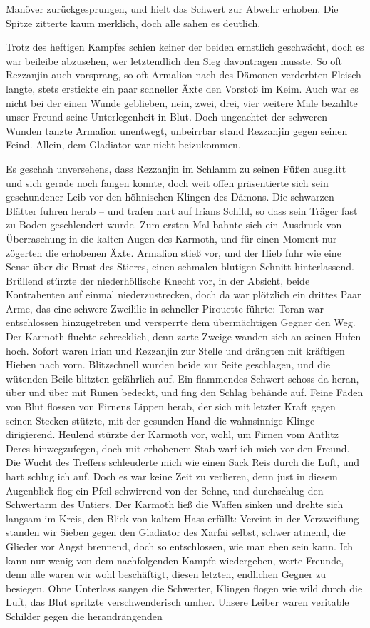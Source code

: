 Manöver zurückgesprungen, und hielt das Schwert zur Abwehr erhoben. Die Spitze zitterte kaum merklich, doch alle sahen es deutlich.

Trotz des heftigen Kampfes schien keiner der beiden ernstlich geschwächt, doch es war beileibe abzusehen, wer letztendlich den Sieg davontragen musste. So oft Rezzanjin auch vorsprang, so oft Armalion nach des Dämonen verderbten Fleisch langte, stets erstickte ein paar schneller Äxte den Vorstoß im Keim. Auch war es nicht bei der einen Wunde geblieben, nein, zwei, drei, vier weitere Male bezahlte unser Freund seine Unterlegenheit in Blut. Doch ungeachtet der schweren Wunden tanzte Armalion unentwegt, unbeirrbar stand Rezzanjin gegen seinen Feind. Allein, dem Gladiator war nicht beizukommen.

Es geschah unversehens, dass Rezzanjin im Schlamm zu seinen Füßen ausglitt und sich gerade noch fangen konnte, doch weit offen präsentierte sich sein geschundener Leib vor den höhnischen Klingen des Dämons. Die schwarzen Blätter fuhren herab -- und trafen hart auf Irians Schild, so dass sein Träger fast zu Boden geschleudert wurde. Zum ersten Mal bahnte sich ein Ausdruck von Überraschung in die kalten Augen des Karmoth, und für einen Moment nur zögerten die erhobenen Äxte. Armalion stieß vor, und der Hieb fuhr wie eine Sense über die Brust des Stieres, einen schmalen blutigen Schnitt hinterlassend. Brüllend stürzte der niederhöllische Knecht vor, in der Absicht, beide Kontrahenten auf einmal niederzustrecken, doch da war plötzlich ein drittes Paar Arme, das eine schwere Zweililie in schneller Pirouette führte: Toran war entschlossen hinzugetreten und versperrte dem übermächtigen Gegner den Weg. Der Karmoth fluchte schrecklich, denn zarte Zweige wanden sich an seinen Hufen hoch. Sofort waren Irian und Rezzanjin zur Stelle und drängten mit kräftigen Hieben nach vorn. Blitzschnell wurden beide zur Seite geschlagen, und die wütenden Beile blitzten gefährlich auf. Ein flammendes Schwert schoss da heran, über und über mit Runen bedeckt, und fing den Schlag behände auf. Feine Fäden von Blut flossen von Firnens Lippen herab, der sich mit letzter Kraft gegen seinen Stecken stützte, mit der gesunden Hand die wahnsinnige Klinge dirigierend. Heulend stürzte der Karmoth vor, wohl, um Firnen vom Antlitz Deres hinwegzufegen, doch mit erhobenem Stab warf ich mich vor den Freund. Die Wucht des Treffers schleuderte mich wie einen Sack Reis durch die Luft, und hart schlug ich auf. Doch es war keine Zeit zu verlieren, denn just in diesem Augenblick flog ein Pfeil schwirrend von der Sehne, und durchschlug den Schwertarm des Untiers. Der Karmoth ließ die Waffen sinken und drehte sich langsam im Kreis, den Blick von kaltem Hass erfüllt: Vereint in der Verzweiflung standen wir Sieben gegen den Gladiator des Xarfai selbst, schwer atmend, die Glieder vor Angst brennend, doch so entschlossen, wie man eben sein kann. Ich kann nur wenig von dem nachfolgenden Kampfe wiedergeben, werte Freunde, denn alle waren wir wohl beschäftigt, diesen letzten, endlichen Gegner zu besiegen. Ohne Unterlass sangen die Schwerter, Klingen flogen wie wild durch die Luft, das Blut spritzte verschwenderisch umher. Unsere Leiber waren veritable Schilder gegen die herandrängenden 
